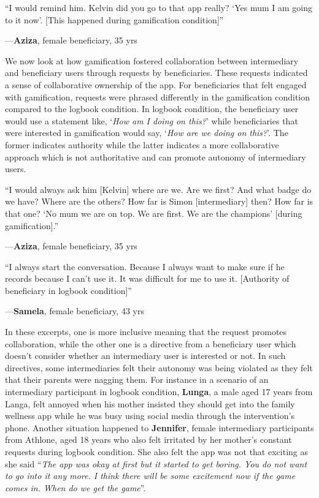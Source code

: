 \documentclass{sig-alternate}
\newenvironment{myquote}
               {\list{}{\rightmargin   \leftmargin
                        \parsep        0in }%
                \item\relax}
               {\endlist}
\newcommand{\userquote}[2]{\begin{samepage}\begin{myquote} 
     \em{\small{#2\begin{flushright}---#1\end{flushright}}}
   \end{myquote}\end{samepage}}
\begin{document}
\userquote{\textbf{Aziza}, female beneficiary, 35 yrs} {``I would remind him. Kelvin did you go to that app really? `Yes mum I am going to it now'. [This happened during gamification condition]''} 

We now look at how gamification fostered collaboration between intermediary and beneficiary users through requests by beneficiaries. These requests indicated a sense of collaborative ownership of the app. For beneficiaries that felt engaged with gamification, requests were phrased differently in the gamification condition compared to the logbook condition. In logbook condition, the beneficiary user would use a statement like, `\emph{How am I doing on this?}' while beneficiaries that were interested in gamification would say, `\emph{How are we doing on this?}'. The former indicates authority while the latter indicates a more collaborative approach which is not authoritative and can promote autonomy of intermediary users.

\userquote{\textbf{Aziza}, female beneficiary, 35 yrs}{``I would always ask him [Kelvin] where are we. Are we first? And what badge do we have? Where are the others? How far is Simon [intermediary] then? How far is that one? `No mum we are on top. We are first. We are the champions' [during gamification].''} 

\userquote{\textbf{Samela}, female beneficiary, 43 yrs} {``I always start the conversation. Because I always want to make sure if he records because I can't use it. It was difficult for me to use it. [Authority of beneficiary in logbook condition]''}

In these excerpts, one is more inclusive meaning that the request promotes collaboration, while the other one is a directive from a beneficiary user which doesn't consider whether an intermediary user is interested or not. In such directives, some intermediaries felt their autonomy was being violated as they felt that their parents were nagging them. For instance in a scenario of an intermediary participant in logbook condition, \textbf{Lunga}, a male aged 17 years from Langa, felt annoyed when his mother insisted they should get into the family wellness app while he was busy using social media through the intervention's phone. Another situation happened to \textbf{Jennifer}, female intermediary participants from Athlone, aged 18 years who also felt irritated by her mother's constant requests during logbook condition. She also felt the app was not that exciting as she said ``\emph{The app was okay at first but it started to get boring. You do not want to go into it any more. I think there will be some excitement now if the game comes in. When do we get the game}''. 
\end{document}
